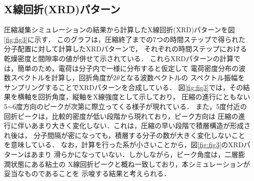 ﻿\documentclass[11pt,a4j]{jarticle}
\begin{document}
\subsection{X線回折(XRD)パターン}
圧縮凝集シミュレーションの結果から計算したX線回折(XRD)パターンを図\ref{fig:fig3}に示す．
このグラフは，圧縮終了までの7つの時間ステップで得られた分子配置に対して計算したXRDパターンで，
それぞれの時間ステップにおける乾燥密度と間隙率の値が併せて示されている．
これらXRDパターンの計算では，簡単のため，電荷は分子内で一様に分布すると仮定して
電荷密度分布の波数スペクトルを計算し，回折角度が$2\theta$となる波数ベクトルの
スペクトル振幅をサンプリングすることでXRDパターンを合成している．
図\ref{fig:fig3}では，その結果を横軸を回折角度，縦軸をX線強度として示しており，
圧縮の進行にともない5$\sim$6度方向のピークが次第に際立ってくる様子が現れている．
また，5度付近の回折ピークは，比較的密度が低い段階から現れており，ピーク方向は
圧縮の進行に伴いあまり大きく変化しない．これは，圧縮の早い段階で積層構造が形成され後は，
分子間隔が密になっても，積層する分子の数が大きく変化しないことを意味している．
なお，計算を行った系が小さいことから，図\ref{fig:fig3}のXRDパターンはあまり
滑らかになっていない．しかしながら，ピーク角度は，二層膨潤状態にある粘土の
X線回折ピークと概ね一致しており\cite{Morodome}，本シミュレーションが妥当なものであることを
示唆する結果と考えられる．
\end{document}
